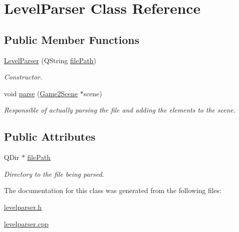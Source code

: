 \hypertarget{classLevelParser}{\section{Level\-Parser Class Reference}
\label{classLevelParser}
}
\subsection*{Public Member Functions}
\begin{DoxyCompactItemize}
\item 
\hypertarget{classLevelParser_aee5be22392eab36591fe956f4cf39baa}{\hyperlink{classLevelParser_aee5be22392eab36591fe956f4cf39baa}{Level\-Parser} (Q\-String \hyperlink{classLevelParser_a065b58408c0fef7d7d72930512fe069f}{file\-Path})}\label{classLevelParser_aee5be22392eab36591fe956f4cf39baa}

\begin{DoxyCompactList}\small\item\em Constructor. \end{DoxyCompactList}\item 
\hypertarget{classLevelParser_ab04f9b5381ec9ba9ab729a43b76e6284}{void \hyperlink{classLevelParser_ab04f9b5381ec9ba9ab729a43b76e6284}{parse} (\hyperlink{classGame2Scene}{Game2\-Scene} $\ast$scene)}\label{classLevelParser_ab04f9b5381ec9ba9ab729a43b76e6284}

\begin{DoxyCompactList}\small\item\em Responsible of actually parsing the file and adding the elements to the scene. \end{DoxyCompactList}\end{DoxyCompactItemize}
\subsection*{Public Attributes}
\begin{DoxyCompactItemize}
\item 
\hypertarget{classLevelParser_a065b58408c0fef7d7d72930512fe069f}{Q\-Dir $\ast$ \hyperlink{classLevelParser_a065b58408c0fef7d7d72930512fe069f}{file\-Path}}\label{classLevelParser_a065b58408c0fef7d7d72930512fe069f}

\begin{DoxyCompactList}\small\item\em Directory to the file being parsed. \end{DoxyCompactList}\end{DoxyCompactItemize}


The documentation for this class was generated from the following files\-:\begin{DoxyCompactItemize}
\item 
\hyperlink{levelparser_8h}{levelparser.\-h}\item 
\hyperlink{levelparser_8cpp}{levelparser.\-cpp}\end{DoxyCompactItemize}
